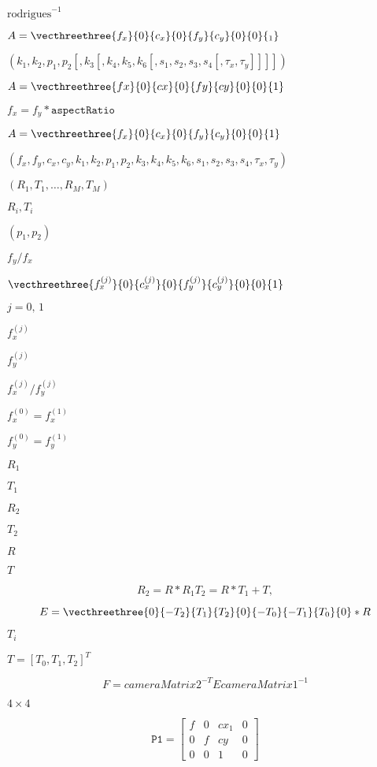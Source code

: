 \documentclass{article}
\begin{document}
$\mathrm{rodrigues}^{-1}$
\pagebreak

$A = \vecthreethree{f_x}{0}{c_x}{0}{f_y}{c_y}{0}{0}{_1}$
\pagebreak

$(k_1, k_2, p_1, p_2[, k_3[, k_4, k_5, k_6 [, s_1, s_2, s_3, s_4[, \tau_x, \tau_y]]]])$
\pagebreak

$A = \vecthreethree{fx}{0}{cx}{0}{fy}{cy}{0}{0}{1}$
\pagebreak

$f_x = f_y * \texttt{aspectRatio}$
\pagebreak

$A = \vecthreethree{f_x}{0}{c_x}{0}{f_y}{c_y}{0}{0}{1}$
\pagebreak

$(f_x, f_y, c_x, c_y, k_1, k_2, p_1, p_2, k_3, k_4, k_5, k_6 , s_1, s_2, s_3, s_4, \tau_x, \tau_y)$
\pagebreak

$(R_1, T_1, \dotsc , R_M, T_M)$
\pagebreak

$R_i, T_i$
\pagebreak

$(p_1, p_2)$
\pagebreak

$f_y/f_x$
\pagebreak

$\vecthreethree{f_x^{(j)}}{0}{c_x^{(j)}}{0}{f_y^{(j)}}{c_y^{(j)}}{0}{0}{1}$
\pagebreak

$j = 0,\, 1$
\pagebreak

$f^{(j)}_x$
\pagebreak

$f^{(j)}_y$
\pagebreak

$f^{(j)}_x/f^{(j)}_y$
\pagebreak

$f^{(0)}_x=f^{(1)}_x$
\pagebreak

$f^{(0)}_y=f^{(1)}_y$
\pagebreak

$R_1$
\pagebreak

$T_1$
\pagebreak

$R_2$
\pagebreak

$T_2$
\pagebreak

$R$
\pagebreak

$T$
\pagebreak

\[R_2=R*R_1 T_2=R*T_1 + T,\]
\pagebreak

\[E= \vecthreethree{0}{-T_2}{T_1}{T_2}{0}{-T_0}{-T_1}{T_0}{0} *R\]
\pagebreak

$T_i$
\pagebreak

$T=[T_0, T_1, T_2]^T$
\pagebreak

\[F = cameraMatrix2^{-T} E cameraMatrix1^{-1}\]
\pagebreak

$4 \times 4$
\pagebreak

\[\texttt{P1} = \begin{bmatrix} f & 0 & cx_1 & 0 \\ 0 & f & cy & 0 \\ 0 & 0 & 1 & 0 \end{bmatrix}\]
\pagebreak
\end{document}
